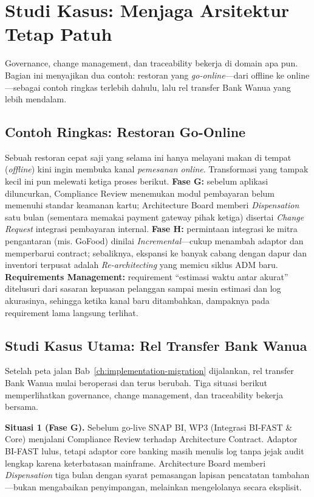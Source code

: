 \section{Studi Kasus: Menjaga Arsitektur Tetap Patuh}

Governance, change management, dan traceability bekerja di domain apa pun. Bagian
ini menyajikan dua contoh: restoran yang \emph{go-online}---dari offline ke
online---sebagai contoh ringkas terlebih dahulu, lalu rel transfer Bank Wanua yang
lebih mendalam.

\subsection{Contoh Ringkas: Restoran Go-Online}

Sebuah restoran cepat saji yang selama ini hanya melayani makan di tempat
(\emph{offline}) kini ingin membuka kanal \emph{pemesanan online}. Transformasi
yang tampak kecil ini pun melewati ketiga proses berikut. \textbf{Fase G:} sebelum aplikasi diluncurkan, Compliance Review
menemukan modul pembayaran belum memenuhi standar keamanan kartu; Architecture
Board memberi \emph{Dispensation} satu bulan (sementara memakai payment gateway
pihak ketiga) disertai \emph{Change Request} integrasi pembayaran internal.
\textbf{Fase H:} permintaan integrasi ke mitra pengantaran (mis. GoFood) dinilai
\emph{Incremental}---cukup menambah adaptor dan memperbarui contract; sebaliknya,
ekspansi ke banyak cabang dengan dapur dan inventori terpusat adalah
\emph{Re-architecting} yang memicu siklus ADM baru. \textbf{Requirements
Management:} requirement ``estimasi waktu antar akurat'' ditelusuri dari sasaran
kepuasan pelanggan sampai mesin estimasi dan log akurasinya, sehingga ketika kanal
baru ditambahkan, dampaknya pada requirement lama langsung terlihat.

\subsection{Studi Kasus Utama: Rel Transfer Bank Wanua}

Setelah peta jalan Bab~\ref{ch:implementation-migration} dijalankan, rel transfer
Bank Wanua mulai beroperasi dan terus berubah. Tiga situasi berikut memperlihatkan
governance, change management, dan traceability bekerja bersama.

\textbf{Situasi 1 (Fase G).} Sebelum go-live SNAP BI, WP3 (Integrasi BI-FAST \&
Core) menjalani Compliance Review terhadap Architecture Contract. Adaptor BI-FAST
lulus, tetapi adaptor core banking masih menulis log tanpa jejak audit lengkap
karena keterbatasan mainframe. Architecture Board memberi \emph{Dispensation} tiga
bulan dengan syarat pemasangan lapisan pencatatan tambahan---bukan mengabaikan
penyimpangan, melainkan mengelolanya secara eksplisit.

